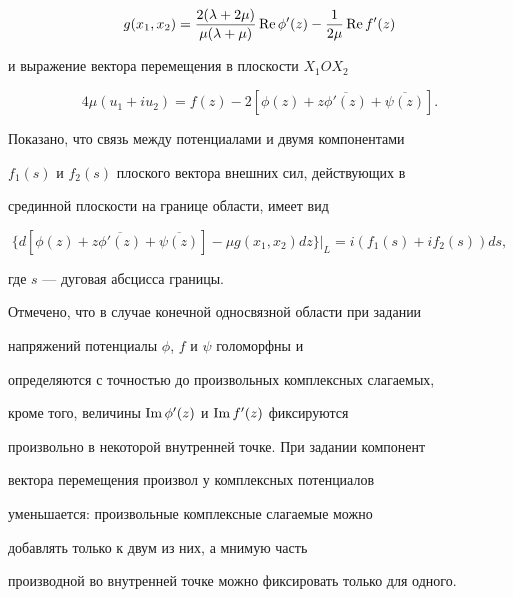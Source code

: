 \begin{equation}


g(x_1,x_2) = \frac{2(\lambda + 2 \mu)}{\mu(\lambda + \mu)} \re \phi'(z)


- \frac{1}{2\mu} \re f'(z)


\end{equation}


и выражение вектора перемещения в плоскости $X_1OX_2$


\begin{equation}


4\mu (u_1 + i u_2) = f(z) - 2[\phi(z) + z\overline{\phi'(z)} +


\overline{\psi(z)}].


\end{equation}


Показано, что связь между потенциалами и двумя компонентами


$f_1(s)$ и $f_2(s)$ плоского вектора внешних сил, действующих в


срединной плоскости на границе области, имеет вид


\begin{equation}


\{d[\phi(z) + z\overline{\phi'(z)} + \overline{\psi(z)}] - \mu


g(x_1,x_2) dz\}\vert_{L} = i(f_1(s) + i f_2(s)) ds,


\end{equation}


где $s$ --- дуговая абсцисса границы.


Отмечено, что в случае конечной односвязной области при задании


напряжений потенциалы $\phi$, $f$ и $\psi$ голоморфны и


определяются с точностью до произвольных комплексных слагаемых,


кроме того, величины $\operatorname{Im} \phi'(z)$ и $\operatorname{Im} f'(z)$ фиксируются


произвольно в некоторой внутренней точке. При задании компонент


вектора перемещения произвол у комплексных потенциалов


уменьшается: произвольные комплексные слагаемые можно


добавлять только к двум из них, а мнимую часть


производной во внутренней точке можно фиксировать только для одного.





